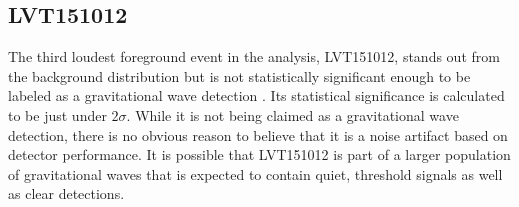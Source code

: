 \subsection{LVT151012}

The third loudest foreground event in the analysis, LVT151012, stands out 
from the background distribution but is not statistically significant 
enough to be labeled as a gravitational wave detection \cite{O1:BBH}. 
Its statistical 
significance is calculated to be just under $2\sigma$. While it is not 
being claimed as a gravitational wave detection, there is no obvious 
reason to believe that it is a noise artifact based on detector 
performance. It is possible that LVT151012 is part of a larger 
population of gravitational waves that is expected to contain 
quiet, threshold signals as well as clear detections.

